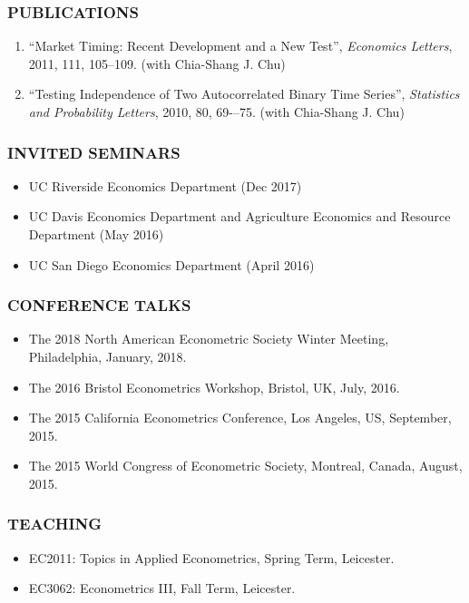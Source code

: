 \documentclass[10pt]{article}
\begin{document}
\subsubsection*{\textcolor{solblue}{PUBLICATIONS}}
\begin{enumerate}
  \item ``Market Timing: Recent Development and a New Test'', {\it Economics Letters}, 2011, 111, 105--109. (with Chia-Shang J. Chu)
  \item ``Testing Independence of Two Autocorrelated Binary Time Series'', {\it Statistics and Probability Letters}, 2010, 80, 69-–75. (with Chia-Shang J. Chu)
\end{enumerate}

\subsubsection*{\textcolor{solblue}{INVITED SEMINARS}}
\begin{itemize}
	\item UC Riverside Economics Department (Dec 2017)
	\item UC Davis Economics Department and Agriculture Economics and Resource Department (May 2016)
	\item UC San Diego Economics Department (April 2016)
\end{itemize}

\subsubsection*{\textcolor{solblue}{CONFERENCE TALKS}}
\begin{itemize}
	\item The 2018 North American Econometric Society Winter Meeting, Philadelphia, January, 2018.
	\item The 2016 Bristol Econometrics Workshop, Bristol, UK, July, 2016.
	\item The 2015 California Econometrics Conference, Los Angeles, US, September, 2015.
	\item The 2015 World Congress of Econometric Society, Montreal, Canada, August, 2015.
\end{itemize}

\subsubsection*{\textcolor{solblue}{TEACHING}}
\begin{itemize}
	\item 	EC2011: Topics in Applied Econometrics, Spring Term, Leicester.
	\item 	EC3062: Econometrics III, Fall Term, Leicester.
\end{itemize}
\end{document}
